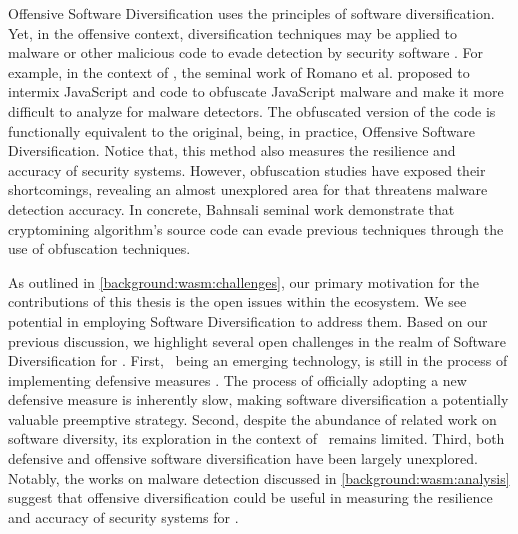Offensive Software Diversification uses the principles of software diversification.
Yet, in the offensive context, diversification techniques may be applied to malware or other malicious code to evade detection by security software \cite{8714698}.
For example, in the context of \wasm, the seminal work of Romano et al.  \cite{wobfuscator} proposed to intermix JavaScript and \wasm code to obfuscate JavaScript malware and make it more difficult to analyze for malware detectors.
The obfuscated version of the code is functionally equivalent to the original, being, in practice, Offensive Software Diversification.
Notice that, this method also measures the resilience and accuracy of security systems.
However, obfuscation studies have exposed their shortcomings, revealing an almost unexplored area for \Wasm that threatens malware detection accuracy.
In concrete, Bahnsali \etal seminal work\cite{10.1145/3507657.3528560} demonstrate that cryptomining algorithm's source code can evade previous techniques through the use of obfuscation techniques.

\label{sota:openchallenges}
As outlined in \autoref{background:wasm:challenges}, our primary motivation for the contributions of this thesis is the open issues within the \Wasm ecosystem. 
We see potential in employing Software Diversification to address them. 
Based on our previous discussion, we highlight several open challenges in the realm of Software Diversification for \Wasm. 
First, \wasm\, being an emerging technology, is still in the process of implementing defensive measures \cite{Stevienart paper here}. 
The process of officially adopting a new defensive measure is inherently slow, making software diversification a potentially valuable preemptive strategy. 
Second, despite the abundance of related work on software diversity, its exploration in the context of \wasm\ remains limited. 
Third, both defensive and offensive software diversification have been largely unexplored. 
Notably, the works on malware detection discussed in \autoref{background:wasm:analysis} suggest that offensive diversification could be useful in measuring the resilience and accuracy of security systems for \Wasm.







